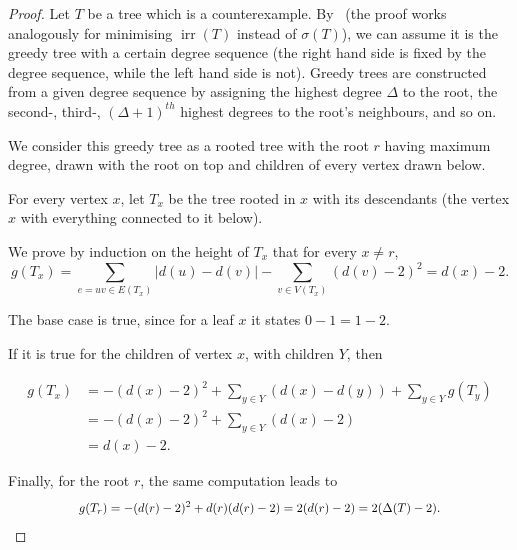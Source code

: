 \documentclass[a4paper,11pt]{article}
\newcommand*{\abs}[1]{\lvert #1\rvert}
\DeclareMathOperator{\irr}{irr}
\begin{document}
\begin{proof}
    Let $T$ be a tree which is a counterexample.
    By~\cite[Thm.~2.1]{DGLC23} (the proof works analogously for minimising $\irr(T)$ instead of $\sigma(T)$), we can assume it is the greedy tree with a certain degree sequence (the right hand side is fixed by the degree sequence, while the left hand side is not).
    Greedy trees are constructed from a given degree sequence by assigning the highest degree $\Delta$ to the root, the second-, third-, $(\Delta+1)^{th}$ highest degrees to the root's neighbours, and so on.



    We consider this greedy tree as a rooted tree with the root $r$ having maximum degree, drawn with the root on top and children of every vertex drawn below.

    For every vertex $x$, let $T_x$ be the tree rooted in $x$ with its descendants (the vertex $x$ with everything connected to it below).
    
    We prove by induction on the height of $T_x$ that for every $x \not =r$,
    $$ g(T_x)=\sum_{e=uv \in E(T_x) } \abs{d(u)-d(v)} - \sum_{v \in V(T_x)} ( d(v)-2)^2 = d(x)-2.$$

    The base case is true, since for a leaf $x$ it states $0-1=1-2.$
    
    If it is true for the children of vertex $x$,
    with children $Y$, then
    
\begin{align*}
    g(T_x)&= - (d(x)-2)^2+ \sum_{y \in Y} (d(x)-d(y))  + \sum_{y \in Y} g(T_y)\\&= - (d(x)-2)^2 +  \sum_{y \in Y} (d(x)-2) \\&= d(x)-2. 
\end{align*}

Finally, for the root $r$, the same computation leads to 
$$\hspace{2cm} g(T_r)= -(d(r)-2)^2 + d(r)(d(r)-2)= 2(d(r)-2)=2(\Delta(T)-2). \hspace{2cm} \qedhere$$
\end{proof}
\end{document}
